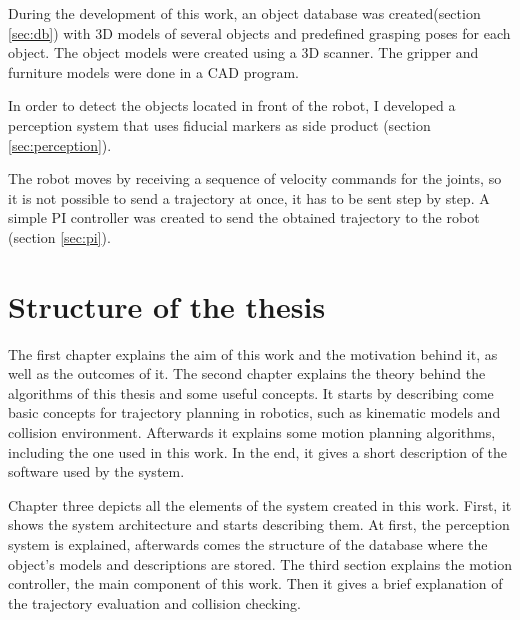 During the development of this work, an object database was created(section \ref{sec:db}) with 3D models of several objects and predefined grasping poses for each object. The object models were created using a 3D scanner. The gripper and furniture models were done in a CAD program.

In order to detect the objects located in front of the robot, I developed a perception system that uses fiducial markers as side product (section \ref{sec:perception}).

The robot moves by receiving a sequence of velocity commands for the joints, so it is not possible to send a trajectory at once, it has to be sent step by step. A simple PI controller was created to send the obtained trajectory to the robot (section \ref{sec:pi}).


\section{Structure of the thesis}

The first chapter explains the aim of this work and the motivation behind it, as well as the outcomes of it. The second chapter explains the theory behind the algorithms of this thesis and some useful concepts. It starts by describing come basic concepts for trajectory planning in robotics, such as kinematic models and collision environment. Afterwards it explains some motion planning algorithms, including the one used in this work. In the end, it gives a short description of the  software used by the system.

Chapter three depicts all the elements of the system created in this work. First, it shows the system architecture and starts describing them. At first, the perception system is explained, afterwards comes the structure of the database where the object's models and descriptions are stored. The third section explains the motion controller, the main component of this work. Then it gives a brief explanation of the trajectory evaluation and collision checking. 




